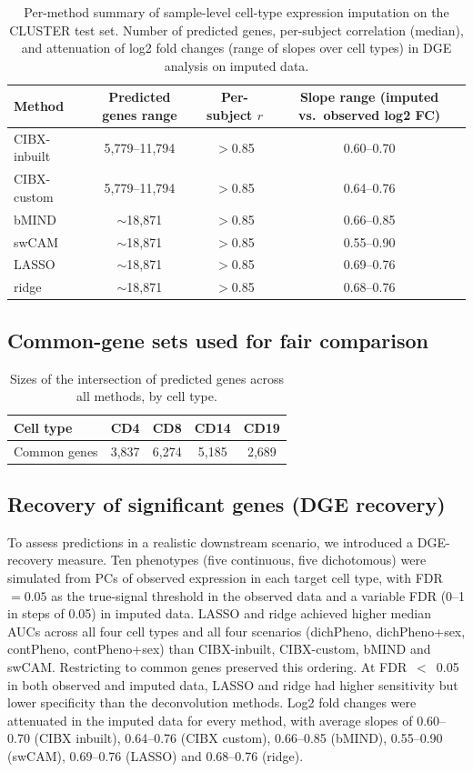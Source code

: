\documentclass[11pt]{article}
\begin{document}
\begin{table}[htbp]
\centering
\caption{Per-method summary of sample-level cell-type expression imputation on the CLUSTER test set. Number of predicted genes, per-subject correlation (median), and attenuation of log2 fold changes (range of slopes over cell types) in DGE analysis on imputed data.}
\label{tab:acc}
\begin{tabular}{lccc}
\toprule
Method & Predicted genes range & Per-subject $r$ & Slope range (imputed vs.\ observed log2 FC) \\
\midrule
CIBX-inbuilt & 5{,}779--11{,}794 & $>$0.85 & 0.60--0.70 \\
CIBX-custom  & 5{,}779--11{,}794 & $>$0.85 & 0.64--0.76 \\
bMIND        & $\sim$18{,}871   & $>$0.85 & 0.66--0.85 \\
swCAM        & $\sim$18{,}871   & $>$0.85 & 0.55--0.90 \\
LASSO        & $\sim$18{,}871   & $>$0.85 & 0.69--0.76 \\
ridge        & $\sim$18{,}871   & $>$0.85 & 0.68--0.76 \\
\bottomrule
\end{tabular}
\end{table}

\subsection{Common-gene sets used for fair comparison}
\begin{table}[htbp]
\centering
\caption{Sizes of the intersection of predicted genes across all methods, by cell type.}
\label{tab:commongenes}
\begin{tabular}{lcccc}
\toprule
Cell type & CD4 & CD8 & CD14 & CD19 \\
\midrule
Common genes & 3{,}837 & 6{,}274 & 5{,}185 & 2{,}689 \\
\bottomrule
\end{tabular}
\end{table}

\subsection{Recovery of significant genes (DGE recovery)}
To assess predictions in a realistic downstream scenario, we introduced a DGE-recovery measure. Ten phenotypes (five continuous, five dichotomous) were simulated from PCs of observed expression in each target cell type, with FDR $=0.05$ as the true-signal threshold in the observed data and a variable FDR (0--1 in steps of 0.05) in imputed data. LASSO and ridge achieved higher median AUCs across all four cell types and all four scenarios (dichPheno, dichPheno+sex, contPheno, contPheno+sex) than CIBX-inbuilt, CIBX-custom, bMIND and swCAM. Restricting to common genes preserved this ordering. At FDR~$<$~0.05 in both observed and imputed data, LASSO and ridge had higher sensitivity but lower specificity than the deconvolution methods. Log2 fold changes were attenuated in the imputed data for every method, with average slopes of 0.60--0.70 (CIBX inbuilt), 0.64--0.76 (CIBX custom), 0.66--0.85 (bMIND), 0.55--0.90 (swCAM), 0.69--0.76 (LASSO) and 0.68--0.76 (ridge).
\end{document}
